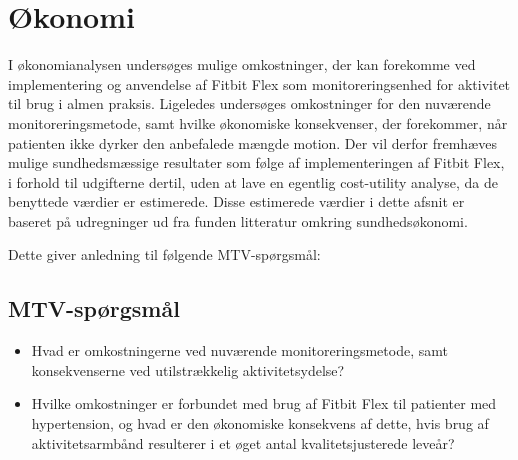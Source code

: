 \section{Økonomi}\label{sec:metode_oeko}
I økonomianalysen undersøges mulige omkostninger, der kan forekomme ved implementering og anvendelse af Fitbit Flex som monitoreringsenhed for aktivitet til brug i almen praksis.
Ligeledes undersøges omkostninger for den nuværende monitoreringsmetode, samt hvilke økonomiske konsekvenser, der forekommer, når patienten ikke dyrker den anbefalede mængde motion.
Der vil derfor fremhæves mulige sundhedsmæssige resultater som følge af implementeringen af Fitbit Flex, i forhold til udgifterne dertil, uden at lave en egentlig cost-utility analyse, da de benyttede værdier er estimerede. 
Disse estimerede værdier i dette afsnit er baseret på udregninger ud fra funden litteratur omkring sundhedsøkonomi.

\noindent
Dette giver anledning til følgende MTV-spørgsmål: 

\subsection{MTV-spørgsmål}
 
\begin{itemize}
\item Hvad er omkostningerne ved nuværende monitoreringsmetode, samt konsekvenserne ved utilstrækkelig aktivitetsydelse? 
\item Hvilke omkostninger er forbundet med brug af Fitbit Flex til patienter med hypertension, og hvad er den økonomiske konsekvens af dette, hvis brug af aktivitetsarmbånd resulterer i et øget antal kvalitetsjusterede leveår?
\end{itemize}


